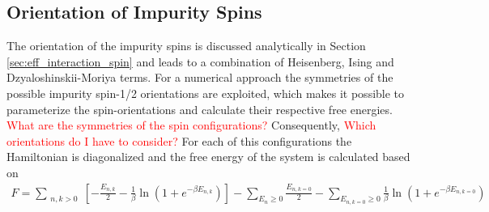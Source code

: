 \subsection{Orientation of Impurity Spins}
The orientation of the impurity spins is discussed analytically in Section \ref{sec:eff_interaction_spin} and leads to a combination of Heisenberg, Ising and Dzyaloshinskii-Moriya terms.\newline %
For a numerical approach the symmetries of the possible impurity spin-1/2 orientations are exploited, which makes it possible to parameterize the spin-orientations and calculate their respective free energies. \newline
\textcolor{red}{What are the symmetries of the spin configurations? } \newline
Consequently, \textcolor{red}{Which orientations do I have to consider?} \newline
For each of this configurations the Hamiltonian is diagonalized and the free energy of the system is calculated based on
\begin{align}\label{eq:free_energy_num}
    F = \sum_{\substack{n,k>0}}\left[ -\frac{E_{n,k}}{2} - \frac{1}{\beta}\ln{(1+ e^{-\beta E_{n,k}})} \right] -\sum_{E_{n} \geq 0} \frac{E_{n,k=0}}{2} - \sum_{E_{n,k=0} \geq 0} \frac{1}{\beta}\ln{(1+ e^{-\beta E_{n,k=0}})}
\end{align}
